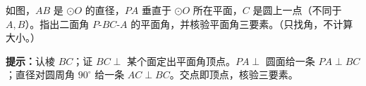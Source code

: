 \documentclass{exam-zh}
\begin{document}

\begin{problem}[points=9]
  \noindent
  \begin{minipage}[t]{\dimexpr\linewidth-60mm-6mm\relax}
    \vspace{0pt}
    如图，$AB$ 是 $\odot O$ 的直径，$PA$ 垂直于 $\odot O$ 所在平面，$C$ 是圆上一点（不同于 $A,B$）。指出二面角 $P\text{-}BC\text{-}A$ 的平面角，并核验平面角三要素。（只找角，不计算大小。）

    \begin{hintbox}
\textbf{提示：}认棱 $BC$；证 $BC\perp$ 某个面定出平面角顶点。$PA\perp$ 圆面给一条 $PA\perp BC$；直径对圆周角 $90^{\circ}$ 给一条 $AC\perp BC$。交点即顶点，核验三要素。\end{hintbox}

  \end{minipage}\hfill
  \begin{diagramcoltikz}{60mm}{PA⊥圆面，AB 为直径，C 在圆上，找二面角 P-BC-A 的平面角顶点。}
  }
  \end{diagramcoltikz}
  \par\medskip
  \answerarea[52mm]
\end{problem}
\end{document}
